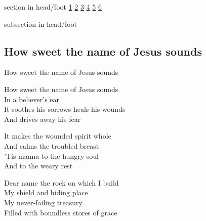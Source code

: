 \documentclass{beamer}
\begin{document}
{
{ 
 {
 \begin{beamercolorbox}[ht=4.5ex,dp=1.5ex,%
      leftskip=.3cm,rightskip=.3cm plus1fil]{section in head/foot}
 \fontsize{12}{25}\selectfont 
\hyperlink{How sweet the name of Jesus sounds[]1}{1}
\hyperlink{How sweet the name of Jesus sounds[]2}{2}
\hyperlink{How sweet the name of Jesus sounds[]3}{3}
\hyperlink{How sweet the name of Jesus sounds[]4}{4}
\hyperlink{How sweet the name of Jesus sounds[]5}{5}
\hyperlink{How sweet the name of Jesus sounds[]6}{6}
 
 \end{beamercolorbox}%
  \begin{beamercolorbox}[ht=2.5ex,dp=1.125ex,%
   leftskip=.3cm,rightskip=.3cm plus1fil]{subsection in head/foot}
   \insertauthor
 \end{beamercolorbox}%
 }
}
\subsection{ How sweet the name of Jesus sounds }

\hypertarget{How sweet the name of Jesus sounds[]1}{}
\begin{frame}{How sweet the name of Jesus sounds }
\fontsize{ 18 }{ 23 }\selectfont

How sweet the name of Jesus sounds\\ 
In a believer's ear\\ 
It soothes his sorrows heals his wounds\\ 
And drives away his fear 

\end{frame}

\hypertarget{How sweet the name of Jesus sounds[]2}{}
\begin{frame}{}
\fontsize{ 18 }{ 23 }\selectfont

It makes the wounded spirit whole\\ 
And calms the troubled breast\\ 
'Tis manna to the hungry soul\\ 
And to the weary rest 

\end{frame}

\hypertarget{How sweet the name of Jesus sounds[]3}{}
\begin{frame}{}
\fontsize{ 18 }{ 23 }\selectfont

Dear name the rock on which I build\\ 
My shield and hiding place\\ 
My never-failing treasury\\ 
Filled with boundless stores of grace 


\end{frame}}
\end{document}
